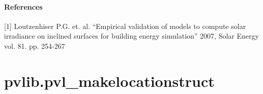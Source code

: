 \documentclass[letterpaper,10pt,english]{sphinxmanual}
\begin{document}
\begin{fulllineitems}
\paragraph{References}

{[}1{]} Loutzenhiser P.G. et. al. ``Empirical validation of models to compute
solar irradiance on inclined surfaces for building energy simulation''
2007, Solar Energy vol. 81. pp. 254-267

\end{fulllineitems}



\section{pvlib.pvl\_makelocationstruct}
\label{stubs/pvlib.pvl_makelocationstruct:pvlib-pvl-makelocationstruct}\label{stubs/pvlib.pvl_makelocationstruct::doc}
\end{document}
